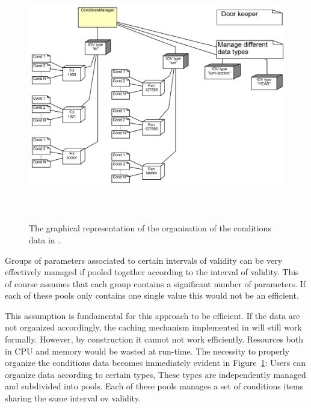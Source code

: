 \documentclass[10pt,a4paper]{article}
\begin{document}
\begin{figure}[t]
  \begin{center}\includegraphics[height=11cm] {DDCond-ConditionsStore}
    \caption{The graphical representation of the organisation of the
             conditions data in \DDH. }
    \label{fig:ddcond-data-organization}
  \end{center}
\end{figure}

\noindent
Groups of parameters associated to certain intervals of validity can
be very effectively managed if pooled together according to the 
interval of validity. This of course assumes that each group contains
a significant number of parameters. If each of these pools only contains
one single value this would not be an efficient.

\noindent
This assumption is fundamental for this approach to be efficient. 
If the data are not
organized accordingly, the caching mechanism implemented in \DDC will 
still work formally. However, by construction it cannot not work efficiently. 
Resources both in CPU and memory would be wasted at run-time.
The necessity to properly organize the conditions data becomes
immediately evident in Figure~\ref{fig:ddcond-data-organization}:
Users can organize data according to certain types, These types are
independently managed and subdivided into pools. Each of these pools
manages a set of conditions items sharing the same interval ov validity.
\end{document}
